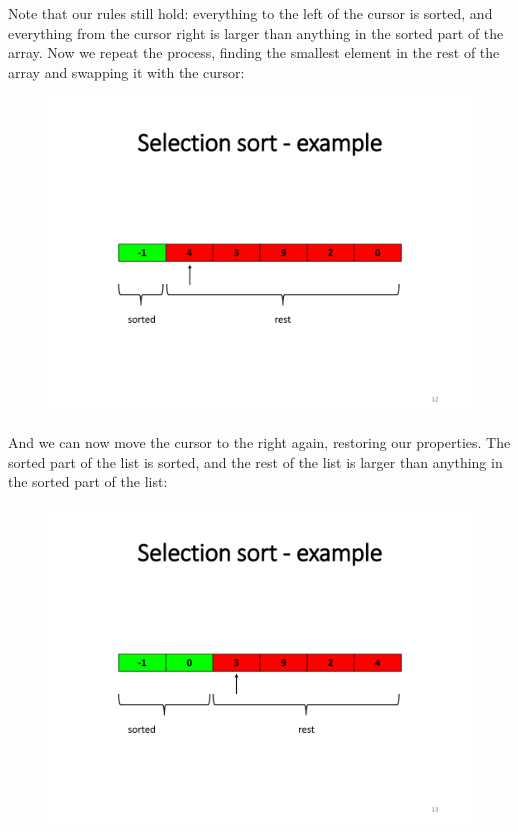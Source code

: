 \documentclass{article}
\begin{document}
\begin{flushleft}
Note that our rules still hold: everything to the left of the cursor is sorted, and everything from
the cursor right is larger than anything in the sorted part of the array. Now we repeat the
process, finding the smallest element in the rest of the array and swapping it with the cursor:

\begin{figure}[H]
\centering
\includegraphics[scale=0.5]{Fig2}
\end{figure}

And we can now move the cursor to the right again, restoring our properties. The sorted part of
the list is sorted, and the rest of the list is larger than anything in the sorted part of the list:

\begin{figure}[H]
\centering
\includegraphics[scale=0.5]{Fig3}
\end{figure}


\end{flushleft}
\end{document}
